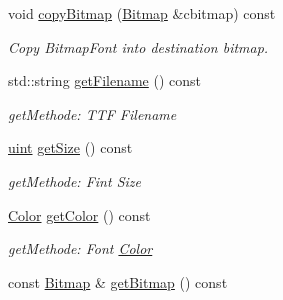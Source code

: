 \begin{DoxyCompactItemize}
void \hyperlink{class_f2_c_1_1_t_t_f_font_afbbfad00d11e781919bd9b88595220c1}{copyBitmap} (\hyperlink{class_f2_c_1_1_bitmap}{Bitmap} \&cbitmap) const 
\begin{DoxyCompactList}\small\item\em Copy BitmapFont into destination bitmap. \item\end{DoxyCompactList}\item 
\hypertarget{class_f2_c_1_1_t_t_f_font_a973eca55478db87c39fb814fcc232ac6}{
std::string \hyperlink{class_f2_c_1_1_t_t_f_font_a973eca55478db87c39fb814fcc232ac6}{getFilename} () const }
\label{class_f2_c_1_1_t_t_f_font_a973eca55478db87c39fb814fcc232ac6}

\begin{DoxyCompactList}\small\item\em getMethode: TTF Filename \item\end{DoxyCompactList}\item 
\hypertarget{class_f2_c_1_1_t_t_f_font_ac16efd7c2834027475a64619e965f544}{
\hyperlink{namespace_f2_c_a58be2bac9eb3e3c99cb41b6008bf4fae}{uint} \hyperlink{class_f2_c_1_1_t_t_f_font_ac16efd7c2834027475a64619e965f544}{getSize} () const }
\label{class_f2_c_1_1_t_t_f_font_ac16efd7c2834027475a64619e965f544}

\begin{DoxyCompactList}\small\item\em getMethode: Fint Size \item\end{DoxyCompactList}\item 
\hypertarget{class_f2_c_1_1_t_t_f_font_a618029b50e7385611dbe5fba673cd985}{
\hyperlink{class_f2_c_1_1_color}{Color} \hyperlink{class_f2_c_1_1_t_t_f_font_a618029b50e7385611dbe5fba673cd985}{getColor} () const }
\label{class_f2_c_1_1_t_t_f_font_a618029b50e7385611dbe5fba673cd985}

\begin{DoxyCompactList}\small\item\em getMethode: Font \hyperlink{class_f2_c_1_1_color}{Color} \item\end{DoxyCompactList}\item 
\hypertarget{class_f2_c_1_1_t_t_f_font_a70e5eb65c951158ef1515afaed455b16}{
const \hyperlink{class_f2_c_1_1_bitmap}{Bitmap} \& \hyperlink{class_f2_c_1_1_t_t_f_font_a70e5eb65c951158ef1515afaed455b16}{getBitmap} () const }
\label{class_f2_c_1_1_t_t_f_font_a70e5eb65c951158ef1515afaed455b16}


\end{DoxyCompactItemize}
